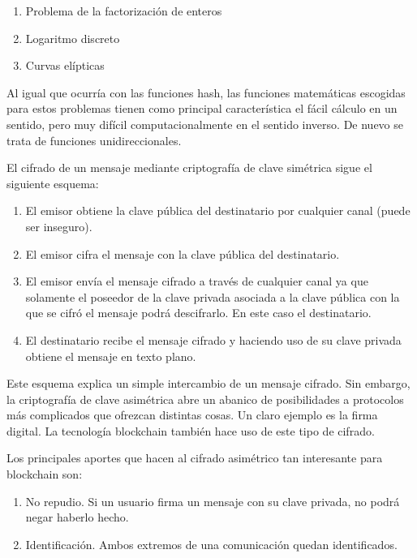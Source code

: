 \begin{enumerate}
	\item Problema de la factorización de enteros
	\item Logaritmo discreto
	\item Curvas elípticas
\end{enumerate}

Al igual que ocurría con las funciones hash, las funciones matemáticas escogidas para estos problemas tienen como principal característica el fácil cálculo en un sentido, pero muy difícil computacionalmente en el sentido inverso. De nuevo se trata de funciones unidireccionales. \newline

El cifrado de un mensaje mediante criptografía de clave simétrica sigue el siguiente esquema:

\begin{enumerate}
	\item El emisor obtiene la clave pública del destinatario por cualquier canal (puede ser inseguro).
	\item El emisor cifra el mensaje con la clave pública del destinatario.
	\item El emisor envía el mensaje cifrado a través de cualquier canal ya que solamente el poseedor de la clave privada asociada a la clave pública con la que se cifró el mensaje podrá descifrarlo. En este caso el destinatario.
	\item El destinatario recibe el mensaje cifrado y haciendo uso de su clave privada obtiene el mensaje en texto plano.
\end{enumerate}

Este esquema explica un simple intercambio de un mensaje cifrado. Sin embargo, la criptografía de clave asimétrica abre un abanico de posibilidades a protocolos más complicados que ofrezcan distintas cosas. Un claro ejemplo es la firma digital. La tecnología blockchain también hace uso de este tipo de cifrado. \newline

Los principales aportes que hacen al cifrado asimétrico tan interesante para blockchain son:

\begin{enumerate}
	\item No repudio. Si un usuario firma un mensaje con su clave privada, no podrá negar haberlo hecho.
	\item Identificación. Ambos extremos de una comunicación quedan identificados.
\end{enumerate}


